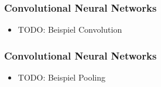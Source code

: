 \documentclass[12pt,utf8]{beamer}
\begin{document}
	\begin{frame}
		\frametitle{Convolutional Neural Networks}
		\begin{itemize}
			\item TODO: Beispiel Convolution
		\end{itemize}
	\end{frame}
	
	\begin{frame}
		\frametitle{Convolutional Neural Networks}
		\begin{itemize}
			\item TODO: Beispiel Pooling
		\end{itemize}
	\end{frame}
	
	\begin{frame}
		
		
	\end{frame}
\end{document}
